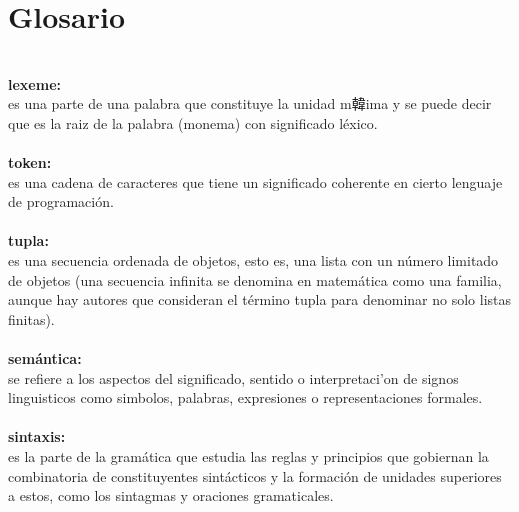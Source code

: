 \documentclass[12pt,oneside]{book}
\begin{document}
\chapter{Glosario}
\ \\
\textbf{lexeme:} \\ es una parte de una palabra que constituye la unidad m韓ima y se puede decir que es la raiz de la palabra (monema) con significado l\'exico.
\ \\ \ \\ 
\textbf{token:} \\  es una cadena de caracteres que tiene un significado coherente en cierto lenguaje de programaci\'on.
\ \\ \ \\ 
\textbf{tupla:} \\es una secuencia ordenada de objetos, esto es, una lista con un n\'umero limitado de objetos (una secuencia infinita se denomina en matem\'atica como una familia, aunque hay autores que consideran el t\'ermino tupla para denominar no solo listas finitas).
\ \\ \ \\ 
\textbf{sem\'antica:} \\ se refiere a los aspectos del significado, sentido o interpretaci'on de signos linguisticos como simbolos, palabras, expresiones o representaciones formales.
\ \\ \ \\
\textbf{sintaxis:} \\ es la parte de la gram\'atica que estudia las reglas y principios que gobiernan la combinatoria de constituyentes sint\'acticos y la formaci\'on de unidades superiores a estos, como los sintagmas y oraciones gramaticales.
\end{document}
